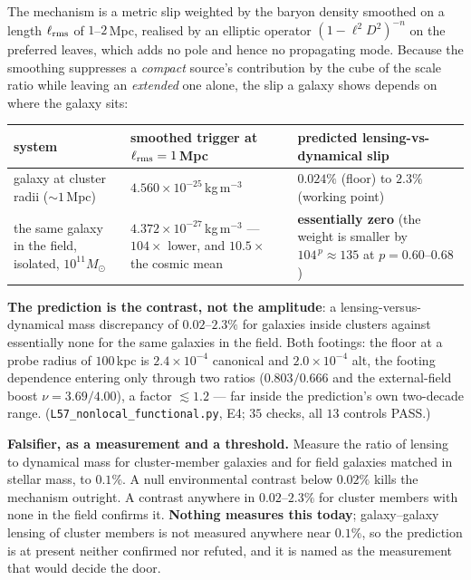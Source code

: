 \documentclass[11pt,letterpaper]{article}
\begin{document}
The mechanism is a metric slip weighted by the baryon density smoothed on a length $\ell_{\rm rms}$ of $1$--$2$\,Mpc, realised by an elliptic operator $(1-\ell^2D^2)^{-n}$ on the preferred leaves, which adds no pole and hence no propagating mode. Because the smoothing suppresses a \emph{compact} source's contribution by the cube of the scale ratio while leaving an \emph{extended} one alone, the slip a galaxy shows depends on where the galaxy sits:
\begin{center}\small
\begin{tabular}{L{0.30\textwidth}L{0.32\textwidth}L{0.30\textwidth}}\toprule
system & smoothed trigger at $\ell_{\rm rms}=1$\,Mpc & predicted lensing-vs-dynamical slip\\\midrule
galaxy at cluster radii ($\sim1$\,Mpc) & $4.560\times10^{-25}$\,kg\,m$^{-3}$ & $\mathbf{0.024\%}$ (floor) to $\mathbf{2.3\%}$ (working point)\\
the same galaxy in the field, isolated, $10^{11}M_\odot$ & $4.372\times10^{-27}$\,kg\,m$^{-3}$ --- $104\times$ lower, and $10.5\times$ the cosmic mean & \textbf{essentially zero} (the weight is smaller by $104^{\,p}\approx135$ at $p=0.60$--$0.68$)\\\bottomrule
\end{tabular}
\end{center}
\textbf{The prediction is the contrast, not the amplitude}: a lensing-versus-dynamical mass discrepancy of $0.02$--$2.3\%$ for galaxies inside clusters against essentially none for the same galaxies in the field. Both footings: the floor at a probe radius of $100$\,kpc is $2.4\times10^{-4}$ canonical and $2.0\times10^{-4}$ alt, the footing dependence entering only through two ratios ($0.803/0.666$ and the external-field boost $\nu=3.69/4.00$), a factor $\lesssim1.2$ --- far inside the prediction's own two-decade range. (\texttt{L57\_nonlocal\_functional.py}, E4; $35$ checks, all $13$ controls PASS.)

\textbf{Falsifier, as a measurement and a threshold.} Measure the ratio of lensing to dynamical mass for cluster-member galaxies and for field galaxies matched in stellar mass, to $\mathbf{0.1\%}$. A null environmental contrast below $0.02\%$ kills the mechanism outright. A contrast anywhere in $0.02$--$2.3\%$ for cluster members with none in the field confirms it. \textbf{Nothing measures this today}; galaxy--galaxy lensing of cluster members is not measured anywhere near $0.1\%$, so the prediction is at present neither confirmed nor refuted, and it is named as the measurement that would decide the door.
\end{document}
